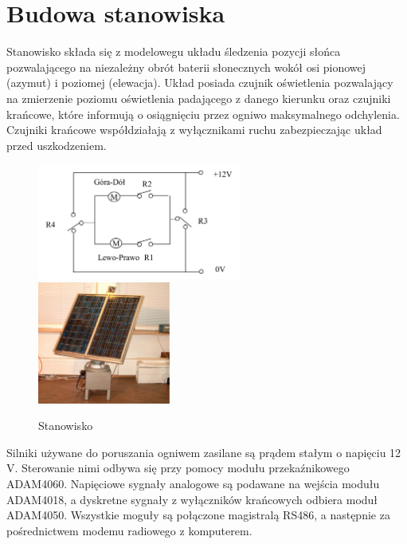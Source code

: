 \documentclass[a4paper, 12pt]{article}
\begin{document}
	\section{Budowa stanowiska}
		Stanowisko składa się z modelowegu układu śledzenia pozycji słońca pozwalającego na niezależny obrót baterii słonecznych wokół osi pionowej (azymut) i poziomej (elewacja). Układ posiada czujnik oświetlenia pozwalający na zmierzenie poziomu oświetlenia padającego z danego kierunku oraz czujniki krańcowe, które informują o osiągnięciu przez ogniwo maksymalnego odchylenia. Czujniki krańcowe współdziałają z wyłącznikami ruchu zabezpieczając układ przed uszkodzeniem.
		\begin{figure}[H]
			\centering
			\includegraphics[width = 0.6\textwidth]{./img/bad_motors.png}
			\includegraphics[width = 0.39\textwidth]{./img/ogniwa.png}
			\caption{Stanowisko}
		\end{figure}
		\noindent
		Silniki używane do poruszania ogniwem zasilane są prądem stałym o napięciu 12$\,$V. Sterowanie nimi odbywa się przy pomocy modułu przekaźnikowego ADAM4060. Napięciowe sygnały analogowe są podawane na wejścia modułu ADAM4018, a dyskretne sygnały z wyłączników krańcowych odbiera moduł ADAM4050. Wszystkie moguły są połączone magistralą RS486, a następnie za pośrednictwem modemu radiowego z komputerem.
\end{document}

